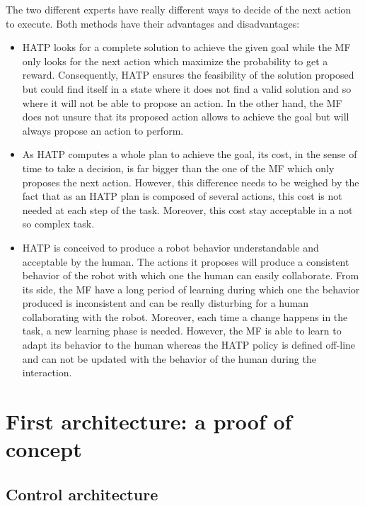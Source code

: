 \documentclass[english,a4paper,11pt,twoside]{StyleThese}
\begin{document}
The two different experts have really different ways to decide of the next action to execute. Both methods have their advantages and disadvantages:
\begin{itemize}
\item HATP looks for a complete solution to achieve the given goal while the MF only looks for the next action which maximize the probability to get a reward. Consequently, HATP ensures the feasibility of the solution proposed but could find itself in a state where it does not find a valid solution and so where it will not be able to propose an action. In the other hand, the MF does not unsure that its proposed action allows to achieve the goal but will always propose an action to perform.
\item As HATP computes a whole plan to achieve the goal, its cost, in the sense of time to take a decision, is far bigger than the one of the MF which only proposes the next action. However, this difference needs to be weighed by the fact that as an HATP plan is composed of several actions, this cost is not needed at each step of the task. Moreover, this cost stay acceptable in a not so complex task.
\item HATP is conceived to produce a robot behavior understandable and acceptable by the human. The actions it proposes will produce a consistent behavior of the robot with which one the human can easily collaborate. From its side, the MF have a long period of learning during which one the behavior produced is inconsistent and can be really disturbing for a human collaborating with the robot. Moreover, each time a change happens in the task, a new learning phase is needed. However, the MF is able to learn to adapt its behavior to the human whereas the HATP policy is defined off-line and can not be updated with the behavior of the human during the interaction.
\end{itemize}


\section{First architecture: a proof of concept}


\subsection{Control architecture}
\end{document}
